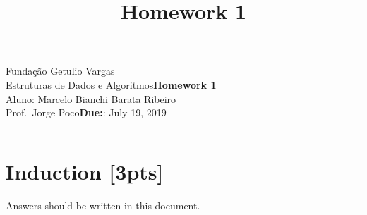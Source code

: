 \documentclass{article}
\title{Homework 1}
\date{}
\newcommand{\assignment}{Homework 1}
\newcommand{\duedate}{July 19, 2019}
\begin{document}
Fundação Getulio Vargas\hfill\\
Estruturas de Dados e Algoritmos\hfill\textbf{\assignment}\\
Aluno: Marcelo Bianchi Barata Ribeiro\\
Prof.\ Jorge Poco\hfill\textbf{Due:}: \duedate\\
\smallskip\hrule\bigskip

{\let\newpage\relax\maketitle}
\maketitle


\section{Induction [3pts]}
Answers should be written in this document. 
\end{document}
